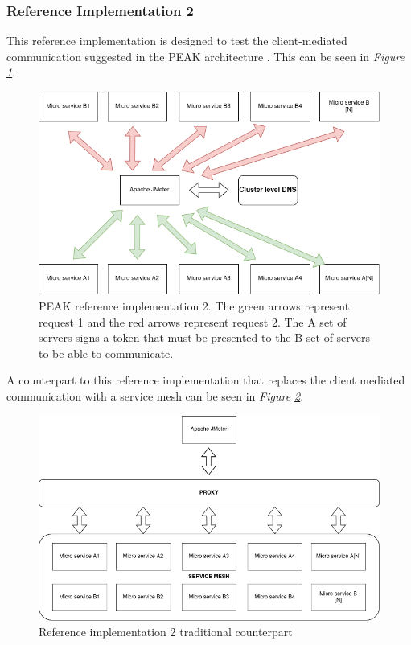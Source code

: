 \documentclass[12pt]{article}
\begin{document}
\subsubsection{Reference Implementation 2}
This reference implementation is designed to test the client-mediated communication suggested in the PEAK architecture \cite{heimonenPreprintPEAKProxy2024}.
This can be seen in \textit{Figure \ref{fig:test-two}}.

\begin{figure}[H]
    \centering
    \includegraphics[width=\textwidth]{test-two.drawio.png}
    \caption{PEAK reference implementation 2. The green arrows represent request 1 and the red arrows represent request 2.
    The A set of servers signs a token that must be presented to the B set of servers to be able to communicate.}
    \label{fig:test-two}
\end{figure}

A counterpart to this reference implementation that replaces the client mediated communication with a service mesh can be seen in \textit{Figure \ref{fig:test-two-traditional}}.

\begin{figure}[H]
    \centering
    \includegraphics[width=\textwidth]{test-two-traditional.drawio.png}
    \caption{Reference implementation 2 traditional counterpart}
    \label{fig:test-two-traditional}
\end{figure}
\end{document}
